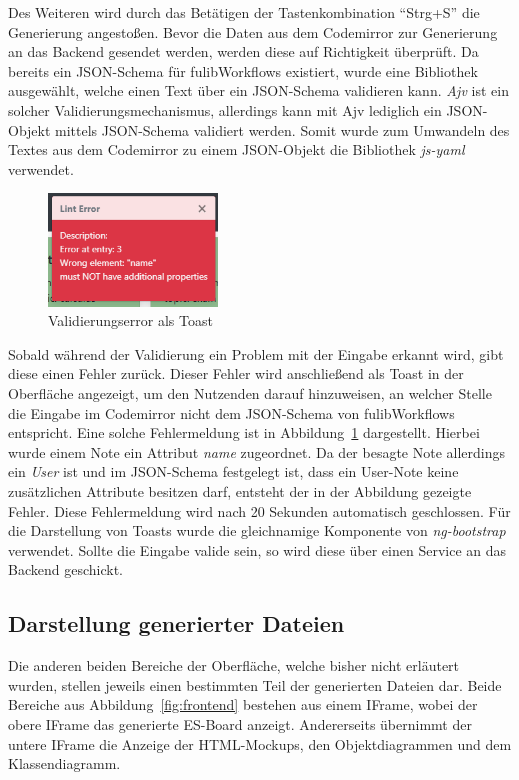 Des Weiteren wird durch das Betätigen der Tastenkombination ``Strg+S'' die Generierung angestoßen.
Bevor die Daten aus dem Codemirror zur Generierung an das Backend gesendet werden, werden diese auf Richtigkeit überprüft.
Da bereits ein JSON-Schema für fulibWorkflows existiert, wurde eine Bibliothek ausgewählt, welche einen Text über ein JSON-Schema validieren kann.
\textit{Ajv} ist ein solcher Validierungsmechanismus, allerdings kann mit Ajv lediglich ein JSON-Objekt mittels JSON-Schema validiert werden\cite*{ajv}.
Somit wurde zum Umwandeln des Textes aus dem Codemirror zu einem JSON-Objekt die Bibliothek \textit{js-yaml} verwendet\cite*{js-yaml}.

\begin{figure}[h]
    \centering
    \includegraphics[width=0.4\textwidth]{images/3.2/error-toast}
    \caption{Validierungserror als Toast}
    \label{fig:error-toast}
\end{figure}

Sobald während der Validierung ein Problem mit der Eingabe erkannt wird, gibt diese einen Fehler zurück.
Dieser Fehler wird anschließend als Toast in der Oberfläche angezeigt, um den Nutzenden darauf hinzuweisen, an welcher Stelle die Eingabe im Codemirror nicht
dem JSON-Schema von fulibWorkflows entspricht.
Eine solche Fehlermeldung ist in Abbildung~\ref{fig:error-toast} dargestellt.
Hierbei wurde einem Note ein Attribut \textit{name} zugeordnet.
Da der besagte Note allerdings ein \textit{User} ist und im JSON-Schema festgelegt ist, dass ein User-Note keine zusätzlichen Attribute
besitzen darf, entsteht der in der Abbildung gezeigte Fehler.
Diese Fehlermeldung wird nach 20 Sekunden automatisch geschlossen.
Für die Darstellung von Toasts wurde die gleichnamige Komponente von \textit{ng-bootstrap} verwendet.
Sollte die Eingabe valide sein, so wird diese über einen Service an das Backend geschickt.

\subsection{Darstellung generierter Dateien}\label{subsec:darstellung-generierter-dateien}
Die anderen beiden Bereiche der Oberfläche, welche bisher nicht erläutert wurden, stellen jeweils einen bestimmten Teil der generierten Dateien dar.
Beide Bereiche aus Abbildung~\ref{fig:frontend} bestehen aus einem IFrame, wobei der obere IFrame das generierte \ac{ES}-Board anzeigt.
Andererseits übernimmt der untere IFrame die Anzeige der HTML-Mockups, den Objektdiagrammen und dem Klassendiagramm.

